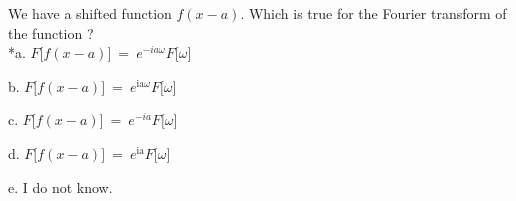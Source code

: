 
We have a shifted function \(f(x - a)\). Which is true for the
Fourier transform of the function ? \\

*a.
\(F\lbrack f(x - a)\rbrack\  = \ e^{- ia\omega}F\lbrack\omega\rbrack\)

b.
\(F\lbrack f(x - a)\rbrack\  = \ e^{\text{ia}\omega}F\lbrack\omega\rbrack\)

c. \(F\lbrack f(x - a)\rbrack\  = \ e^{- ia}F\lbrack\omega\rbrack\)

d. \(F\lbrack f(x - a)\rbrack\  = \ e^{\text{ia}}F\lbrack\omega\rbrack\)

e. I do not know. \\
